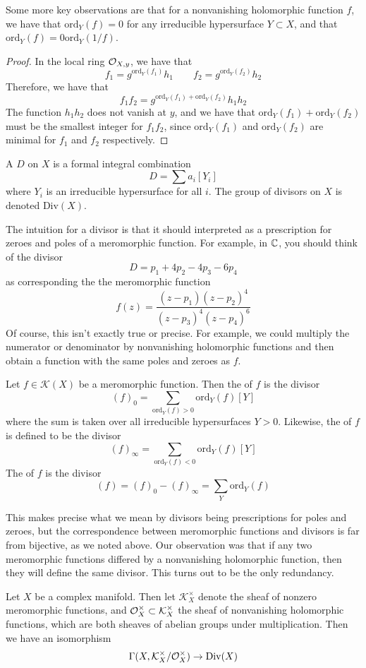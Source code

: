 %
Some more key observations are that for a nonvanishing holomorphic function $f$, we have
that $\mathrm{ord}_Y(f) = 0$ for any irreducible hypersurface $Y \subset X$, and
that $\mathrm{ord}_Y(f) = 0 \mathrm{ord}_Y(1/f)$.
%
\begin{proof}
In the local ring $\mathcal{O}_{X,y}$, we have that
\[
f_1 = g^{\mathrm{ord}_Y(f_1)}h_1 \qquad f_2 = g^{\mathrm{ord}_Y(f_2)}h_2
\]
Therefore, we have that
\[
f_1f_2 = g^{\mathrm{ord}_Y(f_1) + \mathrm{ord}_Y(f_2)}h_1h_2
\]
The function $h_1h_2$ does not vanish at $y$, and we have that
$\mathrm{ord}_Y(f_1) + \mathrm{ord}_Y(f_2)$ must be the smallest integer for
$f_1f_2$, since $\mathrm{ord}_Y(f_1)$ and $\mathrm{ord}_Y(f_2)$ are minimal for
$f_1$ and $f_2$ respectively.
\end{proof}
%
\begin{defn}
A  $D$ on $X$ is a formal integral combination
\[
D = \sum a_i[Y_i]
\]
where $Y_i$ is an irreducible hypersurface for all $i$. The group of divisors on
$X$ is denoted $\mathrm{Div}(X)$.
\end{defn}
%
The intuition for a divisor is that it should interpreted as a prescription for zeroes
and poles of a meromorphic function. For example, in $\mathbb{C}$, you should think of
the divisor
\[
D = p_1 + 4p_2 - 4p_3 - 6p_4
\]
as corresponding the the meromorphic function
\[
f(z) = \frac{(z-p_1)(z-p_2)^4}{(z-p_3)^4(z-p_4)^6}
\]
Of course, this isn't exactly true or precise. For example, we could multiply the
numerator or denominator by nonvanishing holomorphic functions and then obtain a function
with the same poles and zeroes as $f$.
%
\begin{defn}
Let $f \in \mathcal{K}(X)$ be a meromorphic function. Then the  of
$f$ is the divisor
\[
(f)_0 = \sum_{\mathrm{ord}_Y(f) > 0} \mathrm{ord}_Y(f)[Y]
\]
where the sum is taken over all irreducible hypersurfaces $Y > 0$. Likewise, the
 of $f$ is defined to be the divisor
\[
(f)_\infty = \sum_{\mathrm{ord}_Y(f) < 0} \mathrm{ord}_Y(f)[Y]
\]
The  of $f$ is the divisor
\[
(f) = (f)_0 - (f)_\infty = \sum_Y \mathrm{ord}_Y(f)
\]
\end{defn}
%
This makes precise what we mean by divisors being prescriptions for poles and
zeroes, but the correspondence between meromorphic functions and divisors is
far from bijective, as we noted above. Our observation was that if any two meromorphic
functions differed by a nonvanishing holomorphic function, then they will define the
same divisor. This turns out to be the only redundancy.
%
\begin{thm}
Let $X$ be a complex manifold. Then let $\mathcal{K}^\times_X$ denote the sheaf of
nonzero meromorphic functions, and $\mathcal{O}_X^\times \subset \mathcal{K}^\times_X$ the sheaf
of nonvanishing holomorphic functions, which are both sheaves of abelian groups
under multiplication. Then we have an isomorphism
\[
\Gamma(X, \mathcal{K}^\times_X/\mathcal{O}^\times_X) \to \mathrm{Div}(X)
\]
\end{thm}
